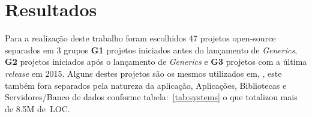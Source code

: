 \chapter{Resultados}
%
%
%

Para a realização deste trabalho foram escolhidos 47 projetos open-source separados em 3 grupos \textbf{G1} projetos iniciados antes do lançamento de \textit{Generics}, \textbf{G2} projetos iniciados após o lançamento de \textit{Generics} e \textbf{G3} projetos com a última \textit{release} em 2015. Alguns destes projetos são os mesmos utilizados em, \cite{Parnin:ACM2011, Dyer:ACM2014, ward2015performance}, este também fora separados pela natureza da aplicação,  Aplicações, Bibliotecas e Servidores/Banco de dados conforme tabela:~\ref{tab:systems} o que totalizou mais de 8.5M de~\acs{LOC}.

